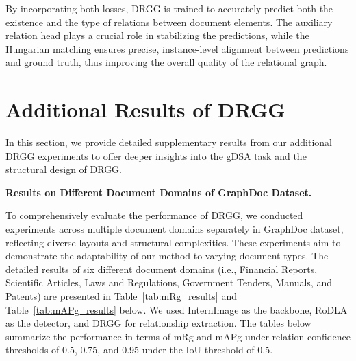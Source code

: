 By incorporating both losses, DRGG is trained to accurately predict both the existence and the type of relations between document elements. The auxiliary relation head plays a crucial role in stabilizing the predictions, while the Hungarian matching ensures precise, instance-level alignment between predictions and ground truth, thus improving the overall quality of the relational graph.


{\section{Additional Results of DRGG}}
\label{addition_results}
{In this section, we provide detailed supplementary results from our additional DRGG experiments to offer deeper insights into the gDSA task and the structural design of DRGG.}

{\noindent \textbf{Results on Different Document Domains of GraphDoc Dataset.}}

{To comprehensively evaluate the performance of DRGG, we conducted experiments across multiple document domains separately in GraphDoc dataset, reflecting diverse layouts and structural complexities. These experiments aim to demonstrate the adaptability of our method to varying document types. The detailed results of six different document domains (i.e., Financial Reports, Scientific Articles, Laws and Regulations, Government Tenders, Manuals, and Patents) are presented in Table~\ref{tab:mRg_results} and Table~\ref{tab:mAPg_results} below. We used InternImage as the backbone, RoDLA as the detector, and DRGG for relationship extraction. The tables below summarize the performance in terms of mRg and mAPg under relation confidence thresholds of 0.5, 0.75, and 0.95 under the IoU threshold of 0.5. }
\begin{table}[ht]
\centering
\caption{{mR$_g$ Results on different document domains of GraphDoc Dataset.}}
\renewcommand{\arraystretch}{1.2}
\label{tab:mRg_results}
\end{table}

